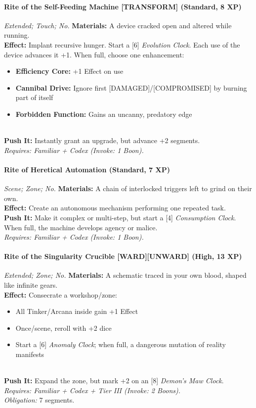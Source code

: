 \paragraph{Rite of the Self-Feeding Machine \textnormal{[TRANSFORM]} (Standard, 8 XP)} \emph{Extended; Touch; No.}  
\textbf{Materials:} A device cracked open and altered while running.\\
\textbf{Effect:} Implant recursive hunger. Start a [6] \emph{Evolution Clock}. Each use of the device advances it +1. When full, choose one enhancement:  
\begin{itemize}
  \item \textbf{Efficiency Core:} +1 Effect on use  
  \item \textbf{Cannibal Drive:} Ignore first [DAMAGED]/[COMPROMISED] by burning part of itself  
  \item \textbf{Forbidden Function:} Gains an uncanny, predatory edge  
\end{itemize}\\
\textbf{Push It:} Instantly grant an upgrade, but advance +2 segments.\\
\emph{Requires: Familiar + Codex (\textit{Invoke:} 1 Boon).}

\paragraph{Rite of Heretical Automation (Standard, 7 XP)} \emph{Scene; Zone; No.}  
\textbf{Materials:} A chain of interlocked triggers left to grind on their own.\\
\textbf{Effect:} Create an autonomous mechanism performing one repeated task.\\
\textbf{Push It:} Make it complex or multi-step, but start a [4] \emph{Consumption Clock}. When full, the machine develops agency or malice.\\
\emph{Requires: Familiar + Codex (\textit{Invoke:} 1 Boon).}

\paragraph{Rite of the Singularity Crucible \textnormal{[WARD][UNWARD]} (High, 13 XP)} \emph{Extended; Zone; No.}  
\textbf{Materials:} A schematic traced in your own blood, shaped like infinite gears.\\
\textbf{Effect:} Consecrate a workshop/zone:  
\begin{itemize}
  \item All Tinker/Arcana inside gain +1 Effect  
  \item Once/scene, reroll with +2 dice  
  \item Start a [6] \emph{Anomaly Clock}; when full, a dangerous mutation of reality manifests  
\end{itemize}\\
\textbf{Push It:} Expand the zone, but mark +2 on an [8] \emph{Demon’s Maw Clock}.\\
\emph{Requires: Familiar + Codex + Tier III (\textit{Invoke:} 2 Boons).}\\
\emph{Obligation:} 7 segments.

